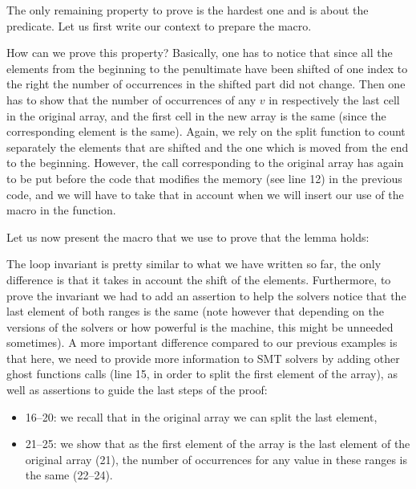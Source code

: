 The only remaining property to prove is the hardest one and is about the
 predicate. Let us first write our context to prepare
the macro.




How can we prove this property? Basically, one has to notice that since all the
elements from the beginning to the penultimate have been shifted of one index
to the right the number of occurrences in the shifted part did not change. Then
one has to show that the number of occurrences of any $v$ in respectively the
last cell in the original array, and the first cell in the new array is the same
(since the corresponding element is the same). Again, we rely on the split
function to count separately the elements that are shifted and the one which is
moved from the end to the beginning. However, the call corresponding to the
original array has again to be put before the code that modifies the memory (see
line 12) in the previous code, and we will have to take that in account when we
will insert our use of the macro in the  function.


Let us now present the macro that we use to prove that the lemma holds:




The loop invariant is pretty similar to what we have written so far, the only
difference is that it takes in account the shift of the elements. Furthermore,
to prove the invariant we had to add an assertion to help the solvers notice
that the last element of both ranges is the same (note however that depending
on the versions of the solvers or how powerful is the machine, this might be
unneeded sometimes). A more important difference compared to our previous
examples is that here, we need to provide more information to SMT solvers by
adding other ghost functions calls (line 15, in order to split the first
element of the array), as well as assertions to guide the last steps of the
proof:


\begin{itemize}
\item 16--20: we recall that in the original array we can split the last
  element,
\item 21--25: we show that as the first element of the array is
  the last element of the original array (21), the number of occurrences for
  any value in these ranges is the same (22--24).
\end{itemize}


